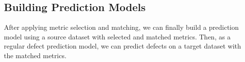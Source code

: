 %


\subsection{Building Prediction Models}

After applying metric selection and matching, we can finally build a
prediction model using a source dataset with selected and matched metrics. Then,
as a regular defect prediction model, we can predict defects on a target dataset
with the matched metrics.
